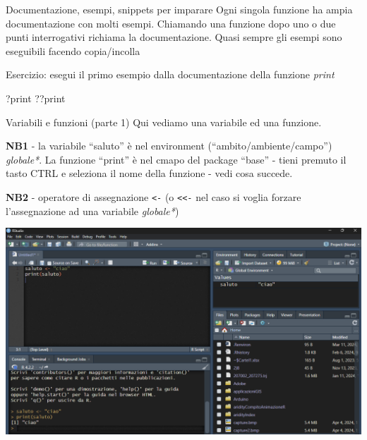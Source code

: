\documentclass[
  ignorenonframetext,
]{beamer}
\newenvironment{Shaded}{\begin{snugshade}}{\end{snugshade}}
\newcommand{\NormalTok}[1]{#1}
\begin{document}
\begin{frame}[fragile]{Documentazione, esempi, snippets per imparare}
\protect\hypertarget{documentazione-esempi-snippets-per-imparare}{}
Ogni singola funzione ha ampia documentazione con molti esempi.
Chiamando una funzione dopo uno o due punti interrogativi richiama la
documentazione. Quasi sempre gli esempi sono eseguibili facendo
copia/incolla

\begin{block}{Esercizio:}
\protect\hypertarget{esercizio-1}{}
esegui il primo esempio dalla documentazione della funzione \emph{print}

\begin{Shaded}
\begin{Highlighting}[]
\NormalTok{?print}
\NormalTok{??print}
\end{Highlighting}
\end{Shaded}
\end{block}
\end{frame}

\begin{frame}[fragile]{Variabili e funzioni (parte 1)}
\protect\hypertarget{variabili-e-funzioni-parte-1}{}
Qui vediamo una variabile ed una funzione.

\textbf{NB1} - la variabile ``saluto'' è nel environment
(``ambito/ambiente/campo'') \emph{globale*}. La funzione ``print'' è nel
cmapo del package ``base'' - tieni premuto il tasto CTRL e seleziona il
nome della funzione - vedi cosa succede.

\textbf{NB2} - operatore di assegnazione \texttt{\textless{}-} (o
\texttt{\textless{}\textless{}-} nel caso si voglia forzare
l'assegnazione ad una variabile \emph{globale*})

\includegraphics[width=10in,height=\textheight]{images/clipboard-3935879104.png}
\end{frame}
\end{document}
